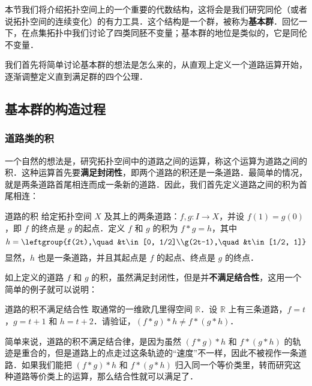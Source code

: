 
本节我们将介绍拓扑空间上的一个重要的代数结构，这将会是我们研究同伦（或者说拓扑空间的连续变化）的有力工具．这个结构是一个群，被称为\textbf{基本群}．回忆一下，在点集拓扑中我们讨论了四类同胚不变量；基本群的地位是类似的，它是同伦不变量．

我们首先将简单讨论基本群的想法是怎么来的，从直观上定义一个道路运算开始，逐渐调整定义直到满足群的四个公理．

\subsection{基本群的构造过程}
\subsubsection{道路类的积}

一个自然的想法是，研究拓扑空间中的道路之间的运算，称这个运算为道路之间的积．这种运算首先要\textbf{满足封闭性}，即两个道路的积还是一条道路．最简单的情况，就是两条道路首尾相连而成一条新的道路．因此，我们首先定义道路之间的积为首尾相连：

\begin{definition}{道路的积}\label{HomT3_def1}
给定拓扑空间 $X$ 及其上的两条道路：$f, g:I\rightarrow X$，并设 $f(1)=g(0)$，即 $f$ 的终点是 $g$ 的起点．定义 $f$ 和 $g$ 的积为 $f*g=h$，其中\begin{equation}h=\leftgroup{f(2t),\quad &t\in[0, 1/2]\\g(2t-1),\quad &t\in[1/2, 1]}\end{equation}
显然，$h$ 也是一条道路，并且其起点是 $f$ 的起点、终点是 $g$ 的终点．
\end{definition}

如上定义的道路 $f$ 和 $g$ 的积，虽然满足封闭性，但是并\textbf{不满足结合性}，这用一个简单的例子就可以说明：

\begin{exercise}{道路的积不满足结合性}
取通常的一维欧几里得空间 $\mathbb{R}$．设 $\mathbb{R}$ 上有三条道路，$f=t$，$g=t+1$ 和 $h=t+2$．请验证，$(f*g)*h\not=f*(g*h)$．
\end{exercise}

简单来说，道路的积不满足结合律，是因为虽然 $(f*g)*h$ 和 $f*(g*h)$ 的轨迹是重合的，但是道路上的点走过这条轨迹的“速度”不一样，因此不被视作一条道路．如果我们能把 $(f*g)*h$ 和 $f*(g*h)$ 归入同一个等价类里，转而研究这种道路等价类上的运算，那么结合性就可以满足了．

